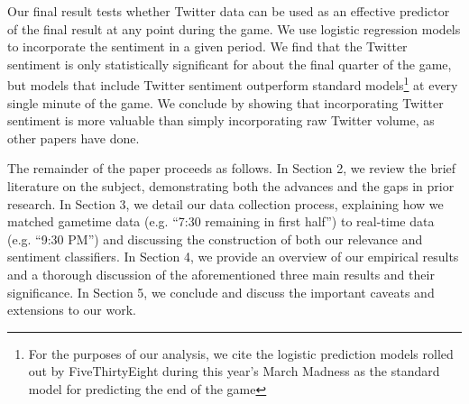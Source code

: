 \documentclass[12pt]{article}
\begin{document}
\begin{doublespacing}
Our final result tests whether Twitter data can be used as an effective predictor of the final result at any point during the game. We use logistic regression models to incorporate the sentiment in a given period. We find that the Twitter sentiment is only statistically significant for about the final quarter of the game, but models that include Twitter sentiment outperform standard models\footnote{For the purposes of our analysis, we cite the logistic prediction models rolled out by FiveThirtyEight during this year's March Madness as the standard model for predicting the end of the game} at every single minute of the game. We conclude by showing that incorporating Twitter sentiment is more valuable than simply incorporating raw Twitter volume, as other papers have done. 

The remainder of the paper proceeds as follows. In Section 2, we review the brief literature on the subject, demonstrating both the advances and the gaps in prior research. In Section 3, we detail our data collection process, explaining how we matched gametime data (e.g. ``7:30 remaining in first half'') to real-time data (e.g. ``9:30 PM'') and discussing the construction of both our relevance and sentiment classifiers. In Section 4, we provide an overview of our empirical results and a thorough discussion of the aforementioned three main results and their significance. In Section 5, we conclude and discuss the important caveats and extensions to our work. 

\end{doublespacing}
\end{document}
